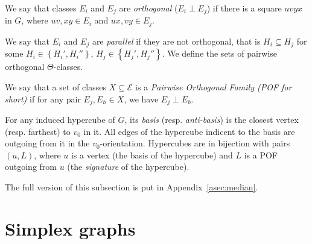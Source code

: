 \documentclass[a4paper,UKenglish,numberwithinsect,cleveref, autoref]{lipics-v2021}
\newcommand{\set}[1]{\left\{ #1 \right\}}
\begin{document}
\begin{definition}
We say that classes $E_i$ and $E_j$ are {\em orthogonal} ($E_i \perp E_j$) if there is a square $uvyx$ in $G$, where $uv,xy \in E_i$ and $ux,vy \in E_j$.
\end{definition}

We say that $E_i$ and $E_j$ are \textit{parallel} if they are not orthogonal, that is $H_i \subseteq H_j$ for some $H_i \in \set{H_i',H_i''}$, $H_j \in \set{H_j',H_j''}$. 
We define the sets of pairwise orthogonal $\Theta$-classes.

\begin{definition}
We say that a set of classes $X \subseteq \mathcal{E}$ is a {\em Pairwise Orthogonal Family (POF for short)} if for any pair $E_j,E_h \in X$, we have $E_j \perp E_h$.
\end{definition}

For any induced hypercube of $G$, its \textit{basis} (resp. \textit{anti-basis}) is the closest vertex (resp. farthest) to $v_0$ in it. All edges of the hypercube indicent to the basis are outgoing from it in the $v_0$-orientation. Hypercubes are in bijection with pairs $(u,L)$, where $u$ is a vertex (the basis of the hypercube) and $L$ is a POF outgoing from $u$ (the \textit{signature} of the hypercube).

The full version of this subsection is put in Appendix~\ref{asec:median}.

%
%


\section{Simplex graphs} \label{sec:simplex}
\end{document}

